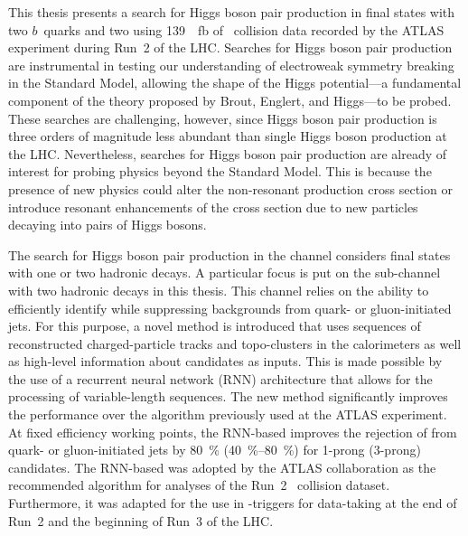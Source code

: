 This thesis presents a search for Higgs boson pair production in final states
with two $b$~quarks and two \tauleptons using \SI{139}{\per\femto\barn} of
\pp~collision data recorded by the ATLAS experiment during Run~2 of the
LHC. Searches for Higgs boson pair production are instrumental in testing our
understanding of electroweak symmetry breaking in the Standard Model, allowing
the shape of the Higgs potential---a fundamental component of the theory
proposed by Brout, Englert, and Higgs---to be probed. These searches are
challenging, however, since Higgs boson pair production is three orders of
magnitude less abundant than single Higgs boson production at the
LHC. Nevertheless, searches for Higgs boson pair production are already of
interest for probing physics beyond the Standard Model. This is because the
presence of new physics could alter the non-resonant \HH production cross
section or introduce resonant enhancements of the cross section due to new
particles decaying into pairs of Higgs bosons.


The search for Higgs boson pair production in the \bbtautau channel considers
final states with one or two hadronic \tauleptonC decays. A particular focus is
put on the sub-channel with two hadronic \tauleptonC decays in this thesis. This
channel relies on the ability to efficiently identify \tauhadvis while
suppressing backgrounds from quark- or gluon-initiated jets. For this purpose, a
novel \tauid method is introduced that uses sequences of reconstructed
charged-particle tracks and topo-clusters in the calorimeters as well as
high-level information about \tauhadvis candidates as inputs. This is made
possible by the use of a recurrent neural network (RNN) architecture that allows
for the processing of variable-length sequences. The new method significantly
improves the \tauid performance over the %
algorithm previously used at the ATLAS experiment. At fixed \tauhadvis
efficiency working points, the RNN-based \tauid improves the rejection of
\faketauhadvis from quark- or gluon-initiated jets by \SI{80}{\percent}
(\SIrange[range-units=single]{40}{80}{\percent}) for 1-prong (3-prong)
\tauhadvis candidates.
The RNN-based \tauid was adopted by the ATLAS collaboration as the recommended
\tauid algorithm for analyses of the Run~2 \pp~collision dataset. Furthermore,
it was adapted for the use in \tauhadvis-triggers for data-taking at the end of
Run~2 and the beginning of Run~3 of the LHC.


